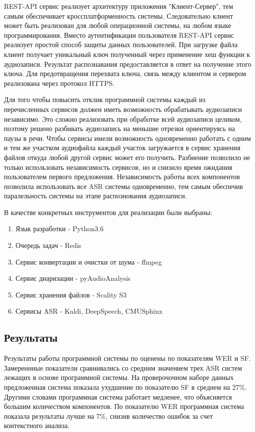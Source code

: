 \documentclass[conference]{IEEEtran}
\begin{document}
REST-API сервис реализует архитектуру приложения "Клиент-Сервер", тем самым обеспечивает кроссплатформенность системы.
Следовательно клиент может быть реализован для любой операционной системы, на любом языке программирования.
Вместо аутентификации пользователя REST-API сервис реализует простой способ защиты данных пользователей.
При загрузке файла клиент получает уникальный ключ полученный через применение хеш функции к аудиозаписи.
Результат распознавания предоставляется в ответ на получение этого ключа.
Для предотвращения перехвата ключа, связь между клиентом и сервером реализована через протокол HTTPS\@.

Для того чтобы повысить отклик программной системы каждый из перечисленных сервисов должен иметь возможность обрабатывать аудиозаписи независимо.
Это сложно реализовать при обработке всей аудиозаписи целиком, поэтому решено разбивать аудиозапись на меньшие отрезки ориентируясь на паузы в речи.
Чтобы сервисы имели возможность одновременно работать с одним и тем же участком аудиофайла каждый участок загружается в сервис хранения файлов откуда любой другой сервис может его получить.
Разбиение позволило не только использовать независимость сервисов, но и снизило время ожидания пользователем первого предложения.
Независимость работы всех компонентов позволила использовать все ASR системы одновременно, тем самым обеспечив паралельность системы на этапе распознования аудиозаписи.

В качестве конкретных инструментов для реализации были выбраны:

\begin{enumerate}
\item Язык разработки - Python3.6
\item Очередь задач - Redis
\item Сервис конвертации и очистки от шума - ffmpeg
\item Сервис диаризации - pyAudioAnalysis
\item Сервис хранения файлов - Scality S3
\item Сервисы ASR - Kaldi, DeepSpeech, CMUSphinx
\end{enumerate}


\subsection{Результаты}
Результаты работы программной системы по оценены по показателям WER и SF\@.
Замереннные показатели сравнивались со средним значением трех ASR систем лежащих в основе программной системы.
На проверочочном наборе данных предложенная система показала ухудшение по показателю SF в среднем на 27\%.
Другими словами программная система работает медленее, что объясняется большим количеством компонентов.
По показателю WER программная система показала результаты лучше на 7\%, снизив количество ошибок за счет контекстного анализа.
\end{document}
